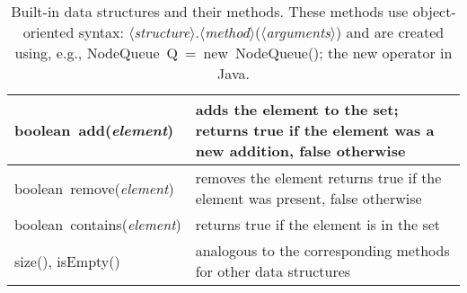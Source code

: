 \begin{table}
  \medskip
  \begin{tabular}{| m{} | m{} |}
    \hline
    \textsf{boolean~add(\emph{element})}
    &
    adds the element to the set;
    returns true if the element was a new addition, false otherwise
    \\ \hline
    \textsf{boolean~remove(\emph{element})}
    &
    removes the element
    returns \textsf{true} if the element was present,
    \textsf{false} otherwise
    \\ \hline
    \textsf{boolean~contains(\emph{element})}
    &
    returns true if the element is in the set
    \\ \hline
    \textsf{size()}, \textsf{isEmpty()}
    &
    analogous to the corresponding methods for other data structures
    \\ \hline
  \end{tabular}

  \caption{Built-in data structures and their methods.
     These methods use object-oriented syntax:
$\langle$\emph{structure}$\rangle$.$\langle$\emph{method}$\rangle$($\langle$\emph{arguments}$\rangle$)
    and are created using, e.g.,
    \textsf{NodeQueue~Q~=~new~NodeQueue();} the \textsf{new} operator in Java.
  }
  \label{tab:data_structures}
\end{table}
